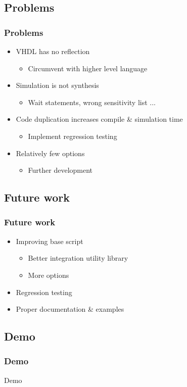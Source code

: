 \documentclass[british,10pt]{beamer}
\begin{document}
\subsection{Problems}
\begin{frame}\frametitle{Problems}
\begin{itemize}
\item VHDL has no reflection
\begin{itemize}
\item Circumvent with higher level language
\end{itemize}
\item Simulation is not synthesis
\begin{itemize}
\item Wait statements, wrong sensitivity list ...
\end{itemize}
\item Code duplication increases compile \& simulation time
\begin{itemize}
\item Implement regression testing
\end{itemize}
\item Relatively few options
\begin{itemize}
\item Further development
\end{itemize}
\end{itemize}
\end{frame}

\subsection{Future work}

\begin{frame}\frametitle{Future work}
\begin{itemize}
\item Improving base script
\begin{itemize}
\item Better integration utility library
\item More options
\end{itemize}
\item Regression testing
\item Proper documentation \& examples
\end{itemize}
\end{frame}

\subsection{Demo}

\begin{frame}\frametitle{Demo}
\centering
\Huge Demo
\end{frame}
\end{document}
